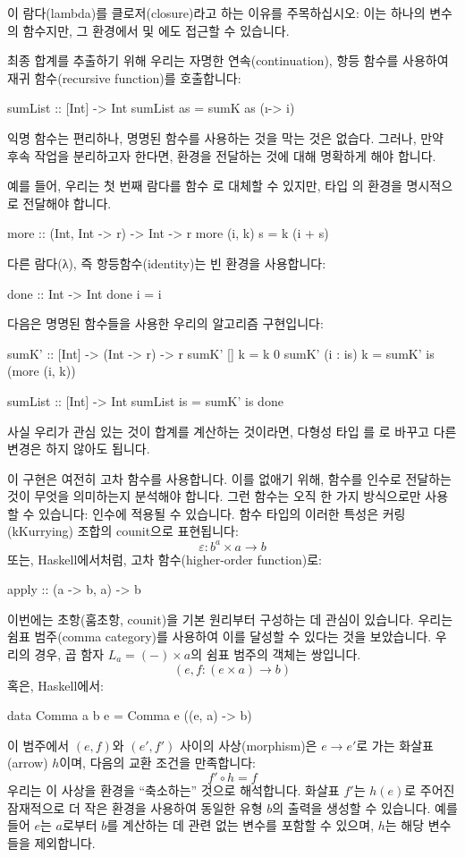 \documentclass[DaoFP]{subfiles}
\begin{document}
이 람다(lambda)를 클로저(closure)라고 하는 이유를 주목하십시오: 이는 하나의 변수 의 함수지만, 그 환경에서  및 에도 접근할 수 있습니다.

최종 합계를 추출하기 위해 우리는 자명한 연속(continuation), 항등 함수를 사용하여 재귀 함수(recursive function)를 호출합니다:
\begin{haskell}
sumList :: [Int] -> Int
sumList as = sumK as (\i -> i)
\end{haskell}

익명 함수는 편리하나, 명명된 함수를 사용하는 것을 막는 것은 없습다. 그러나, 만약 후속 작업을 분리하고자 한다면, 환경을 전달하는 것에 대해 명확하게 해야 합니다.

예를 들어, 우리는 첫 번째 람다를 함수 로 대체할 수 있지만, 타입 의 환경을 명시적으로 전달해야 합니다.
\begin{haskell}
more :: (Int, Int -> r) -> Int -> r
more (i, k) s = k (i + s)
\end{haskell}
다른 람다(λ), 즉 항등함수(identity)는 빈 환경을 사용합니다:
\begin{haskell}
done :: Int -> Int
done i = i
\end{haskell}
다음은 명명된 함수들을 사용한 우리의 알고리즘 구현입니다:
\begin{haskell}
sumK' :: [Int] -> (Int -> r) -> r
sumK' [] k = k 0
sumK' (i : is) k =
  sumK' is (more (i, k))
\end{haskell}

\begin{haskell}
sumList :: [Int] -> Int
sumList is = sumK' is done
\end{haskell}

사실 우리가 관심 있는 것이 합계를 계산하는 것이라면, 다형성 타입 를 로 바꾸고 다른 변경은 하지 않아도 됩니다.

이 구현은 여전히 고차 함수를 사용합니다. 이를 없애기 위해, 함수를 인수로 전달하는 것이 무엇을 의미하는지 분석해야 합니다. 그런 함수는 오직 한 가지 방식으로만 사용할 수 있습니다: 인수에 적용될 수 있습니다. 함수 타입의 이러한 특성은 커링(kKurrying) 조합의 counit으로 표현됩니다:
\[ \varepsilon \colon b^a \times a \to b \]
또는, Haskell에서처럼, 고차 함수(higher-order function)로:
\begin{haskell}
apply :: (a -> b, a) -> b
\end{haskell}
이번에는 초항(훔초항, counit)을 기본 원리부터 구성하는 데 관심이 있습니다. 우리는 쉼표 범주(comma category)를 사용하여 이를 달성할 수 있다는 것을 보았습니다. 우리의 경우, 곱 함자 $L_a = (-) \times a$의 쉼표 범주의 객체는 쌍입니다.
\[(e, f \colon (e \times a) \to b) \]
혹은, Haskell에서:
\begin{haskell}
data Comma a b e = Comma e ((e, a) -> b)
\end{haskell}
이 범주에서 $(e, f)$와 $(e', f')$ 사이의 사상(morphism)은 $e \to e'$로 가는 화살표(arrow) $h$이며, 다음의 교환 조건을 만족합니다:
\[ f' \circ h = f \]
우리는 이 사상을 환경을 ``축소하는'' 것으로 해석합니다. 화살표 $f'$는 $h(e)$로 주어진 잠재적으로 더 작은 환경을 사용하여 동일한 유형 $b$의 출력을 생성할 수 있습니다. 예를 들어 $e$는 $a$로부터 $b$를 계산하는 데 관련 없는 변수를 포함할 수 있으며, $h$는 해당 변수들을 제외합니다.
\end{document}

